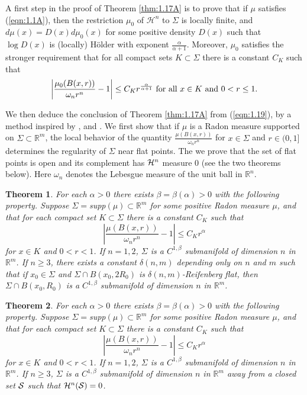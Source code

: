 \documentclass[12pt,leqno]{article}
\newcommand{\RR}{\mathbb{R}}
\renewcommand{\H}{\mathcal{H}}
\theoremstyle{plain}
\newtheorem{thm}{Theorem}[section]
\numberwithin{equation}{section}
\begin{document}
A first step in the proof of Theorem \ref{thm:1.17A} is to prove that if
$\mu$ satisfies (\ref{eqn:1.1A}), then the restriction $\mu_0$ of $\H^n$ to
$\Sigma$ is locally finite, and $d\mu(x)=D(x)d\mu_0(x)$ for some positive
density $D(x)$ such that $\log D(x)$ is (locally) H\"older with exponent
$\frac{\alpha}{\alpha+1}$. Moreover, $\mu_0$ satisfies the stronger
requirement that for all compact sets $K\subset\Sigma$ there is a constant
$C_K$ such that
\begin{equation}\label{eqn:1.19}
\left |\frac{\mu_0(B(x,r))}{\omega_nr^n}-1\right |\le C_K r^{\frac{\alpha}{\alpha+1}}
\hbox{ for
all }x\in K\hbox{ and }0<r\le 1.
\end{equation}

We then deduce the conclusion of Theorem \ref{thm:1.17A} from
(\ref{eqn:1.19}), by a method inspired by \cite{KoP}, \cite{DKT} and \cite{Pr}.
We first show that if $\mu$ is a Radon measure supported on
$\Sigma\subset \RR^m$, the local behavior of the quantity
$\frac{\mu(B(x,r))}{\omega_nr^n}$ for $x\in\Sigma$ and $r\in(0,1]$ determines
the regularity of $\Sigma$ near flat points. The we prove that the set of flat
points is open and its complement has ${\cal H}^n$ measure 0 (see the two
theorems below). Here $\omega_n$ denotes the Lebesgue measure of
the unit ball in $\RR^n$.

\begin{thm}\label{thm:7.1}
For each $\alpha>0$ there exists $\beta=\beta(\alpha)>0$ with the following
property. Suppose $\Sigma=$supp$(\mu)\subset\RR^{m}$ for some positive
Radon measure $\mu$, and that for each compact set $K\subset\Sigma$ there is
a constant $C_K$ such that
\begin{equation}\label{eqn:7.2}
\left|\frac{\mu(B(x,r))}{\omega_nr^n}-1\right|\le C_Kr^\alpha
\end{equation}
for $x\in K$ and $0<r<1$.
If $n=1,2$, $\Sigma$ is
a $C^{1,\beta}$ submanifold of dimension $n$ in $\RR^{m}$.
If $n\ge 3$, there exists a constant $\delta(n,m)$ depending
only on $n$ and $m$ such that if $x_0\in\Sigma$ and $\Sigma\cap B(x_0, 2R_0)$
is $\delta(n,m)$-Reifenberg flat, then $\Sigma\cap B(x_0, R_0)$
is a $C^{1,\beta}$ submanifold of dimension $n$ in $\RR^{m}$.
\end{thm}


\begin{thm}\label{thm:1.8A}
For each $\alpha>0$ there exists $\beta=\beta(\alpha)>0$ with the following
property. Suppose $\Sigma=$supp$(\mu)\subset\RR^{m}$ for some positive
Radon measure $\mu$, and that for each compact set $K\subset\Sigma$ there is
a constant $C_K$ such that
\begin{equation}\label{eqn:7.2AA}
\left|\frac{\mu(B(x,r))}{\omega_nr^n}-1\right|\le C_Kr^\alpha
\end{equation}
for $x\in K$ and $0<r<1$.
If $n=1,2$, $\Sigma$ is
a $C^{1,\beta}$ submanifold of dimension $n$ in $\RR^{m}$.
If $n\ge 3$, $\Sigma$ is a $C^{1,\beta}$ submanifold of dimension $n$
in $\RR^{m}$ away from a closed set ${\cal S}$ such that
${\cal H}^n({\cal S})=0$.
\end{thm}
\end{document}
